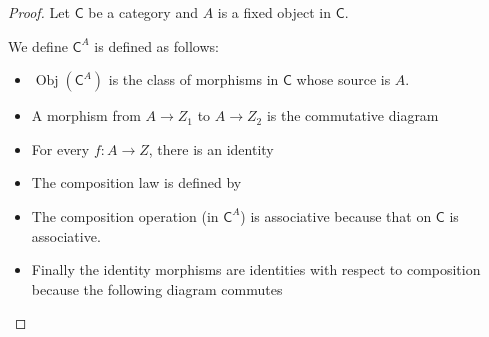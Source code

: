 \begin{proof}
	Let $\mathsf{C}$ be a category and $A$ is a fixed object in $\mathsf{C}$.

	We define ${\mathsf{C}}^{A}$ is defined as follows:
	\begin{itemize}
		\item $\operatorname{Obj}({\mathsf{C}}^{A})$ is the class of morphisms in $\mathsf{C}$ whose source is $A$.
		\item A morphism from $A\to Z_{1}$ to $A\to Z_{2}$ is the commutative diagram
		      \begin{figure}[htp]
			      \centering
		      \end{figure}
		\item For every $f: A\to Z$, there is an identity
		      \begin{figure}[htp]
			      \centering
		      \end{figure}
		\item The composition law is defined by
		      \begin{figure}[htp]
			      \centering
			      \qquad
		      \end{figure}
		\item The composition operation (in $\mathsf{C}^{A}$) is associative because that on $\mathsf{C}$ is associative.
		\item Finally the identity morphisms are identities with respect to composition because the following diagram commutes
		      \begin{figure}[htp]
			      \centering
		      \end{figure}
	\end{itemize}
\end{proof}

